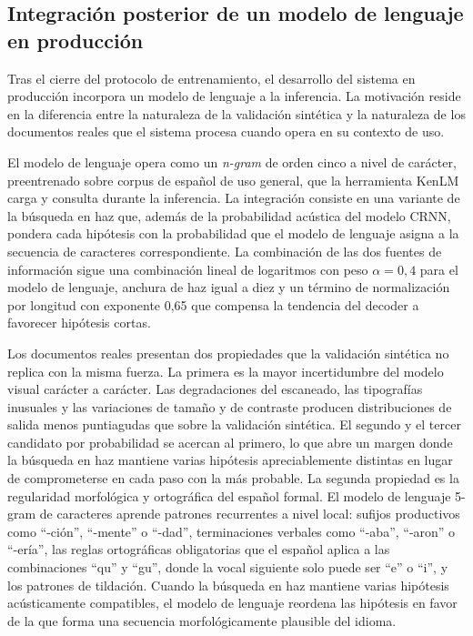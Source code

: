 \subsection{Integración posterior de un modelo de lenguaje en producción}
\label{subsec:lm-posterior}

Tras el cierre del protocolo de entrenamiento, el desarrollo del sistema en producción incorpora un modelo de lenguaje a la inferencia. La motivación reside en la diferencia entre la naturaleza de la validación sintética y la naturaleza de los documentos reales que el sistema procesa cuando opera en su contexto de uso.

El modelo de lenguaje opera como un \textit{n-gram} de orden cinco a nivel de carácter, preentrenado sobre corpus de español de uso general, que la herramienta KenLM~\cite{heafield2011kenlm} carga y consulta durante la inferencia. La integración consiste en una variante de la búsqueda en haz que, además de la probabilidad acústica del modelo CRNN, pondera cada hipótesis con la probabilidad que el modelo de lenguaje asigna a la secuencia de caracteres correspondiente. La combinación de las dos fuentes de información sigue una combinación lineal de logaritmos con peso $\alpha = 0{,}4$ para el modelo de lenguaje, anchura de haz igual a diez y un término de normalización por longitud con exponente 0,65 que compensa la tendencia del decoder a favorecer hipótesis cortas.

Los documentos reales presentan dos propiedades que la validación sintética no replica con la misma fuerza. La primera es la mayor incertidumbre del modelo visual carácter a carácter. Las degradaciones del escaneado, las tipografías inusuales y las variaciones de tamaño y de contraste producen distribuciones de salida menos puntiagudas que sobre la validación sintética. El segundo y el tercer candidato por probabilidad se acercan al primero, lo que abre un margen donde la búsqueda en haz mantiene varias hipótesis apreciablemente distintas en lugar de comprometerse en cada paso con la más probable. La segunda propiedad es la regularidad morfológica y ortográfica del español formal. El modelo de lenguaje 5-gram de caracteres aprende patrones recurrentes a nivel local: sufijos productivos como ``-ción'', ``-mente'' o ``-dad'', terminaciones verbales como ``-aba'', ``-aron'' o ``-ería'', las reglas ortográficas obligatorias que el español aplica a las combinaciones ``qu'' y ``gu'', donde la vocal siguiente solo puede ser ``e'' o ``i'', y los patrones de tildación. Cuando la búsqueda en haz mantiene varias hipótesis acústicamente compatibles, el modelo de lenguaje reordena las hipótesis en favor de la que forma una secuencia morfológicamente plausible del idioma.

